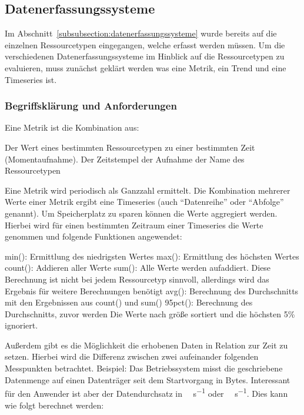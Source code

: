 \subsection{Datenerfassungssysteme}
Im Abschnitt~\ref{subsubsection:datenerfassungssysteme} wurde bereits auf die
einzelnen Ressourcetypen eingegangen, welche erfasst werden müssen. Um die
verschiedenen Datenerfassungssysteme im Hinblick auf die Ressourcetypen zu
evaluieren, muss zunächst geklärt werden was eine Metrik, ein Trend und eine
Timeseries ist.
\tm%

\subsubsection{Begriffsklärung und Anforderungen}
\label{subsubsection:Begriffserklärung}
Eine Metrik ist die Kombination aus:

\begin{outline}
  \1 Der Wert eines bestimmten Ressourcetypen zu einer bestimmten Zeit
  (Momentaufnahme).
  \1 Der Zeitstempel der Aufnahme
  \1 der Name des Ressourcetypen
\end{outline}

Eine Metrik wird periodisch als Ganzzahl ermittelt. Die Kombination mehrerer
Werte einer Metrik ergibt eine Timeseries (auch ``Datenreihe'' oder ``Abfolge''
genannt). Um Speicherplatz zu sparen können die Werte aggregiert werden.
Hierbei wird für einen bestimmten Zeitraum einer Timeseries die Werte genommen
und folgende Funktionen angewendet:

\begin{outline}
  \1 min(): Ermittlung des niedrigsten Wertes
  \1 max(): Ermittlung des höchsten Wertes
  \1 count(): Addieren aller Werte
  \1 sum(): Alle Werte werden aufaddiert. Diese Berechnung ist nicht bei jedem
  Ressourcetyp sinnvoll, allerdings wird das Ergebnis für weitere Berechnungen
  benötigt
  \1 avg(): Berechnung des Durchschnitts mit den Ergebnissen aus count() und
  sum()
  \1 95pct(): Berechnung des Durchschnitts, zuvor werden Die Werte nach größe
  sortiert und die höchsten 5\% ignoriert.
\end{outline}

Außerdem gibt es die Möglichkeit die erhobenen Daten in Relation zur Zeit zu
setzen. Hierbei wird die Differenz zwischen zwei aufeinander folgenden
Messpunkten betrachtet.  Beispiel: Das Betriebssystem misst die geschriebene
Datenmenge auf einen Datenträger seit dem Startvorgang in Bytes. Interessant
für den Anwender ist aber der Datendurchsatz in \si{\mega\byte\per\second} oder
\si{\giga\byte\per\second}. Dies kann wie folgt berechnet werden:

